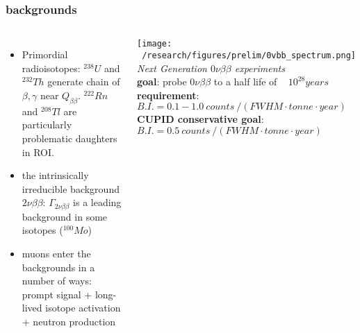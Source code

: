 \documentclass{beamer}
\begin{document}
	\begin{frame}
		\frametitle{backgrounds}
		\begin{columns}[c] %
			
			\begin{itemize}
			\item Primordial radioisotopes: $^{238}U$ and $^{232}Th$ generate chain of $\beta , \gamma$ near $Q_{\beta\beta}$. $^{222}Rn$ and $^{208}Tl$ are particularly problematic daughters in ROI.
			\item the intrinsically irreducible background $2\nu\beta\beta$: $\Gamma_{2\nu\beta\beta}$ is a leading background in some isotopes ($^{100}Mo$)
			\item muons enter the backgrounds in a number of ways: prompt signal + long-lived isotope activation + neutron production
			\end{itemize}			 
			
		
			\texttt{[image: ~/research/figures/prelim/0vbb\_spectrum.png]}
			{\footnotesize \textit{Next Generation $0\nu\beta\beta$ experiments} \\
			\textbf{goal}: probe $0\nu\beta\beta$ to a half life of ~ $10^{28} years$ \\
			\textbf{requirement}: $B.I. = 0.1-1.0 \ counts\ / \left( FWHM\cdot tonne \cdot year \right)$ \\
			\textbf{CUPID conservative goal}: $B.I. = 0.5 \ counts\ / \left( FWHM\cdot tonne \cdot year \right)$}
			
		\end{columns}
	\end{frame}
	
\end{document}
